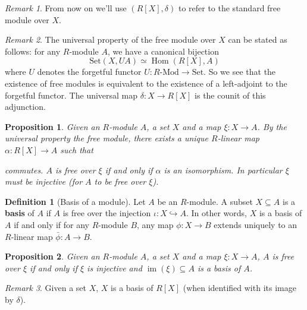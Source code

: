 \documentclass[a4paper,12pt,parskip=half*,chapterprefix=true,numbers=noendperiod]{scrreprt}
\newcommand{\opname}{\operatorname}
\newtheorem{proposition}{Proposition}[section]
\theoremstyle{definition}
\newtheorem{definition}{Definition}[section]
\theoremstyle{remark}
\newtheorem*{remark}{Remark}
\begin{document}
\begin{remark}
	From now on we'll use $(R[X],\delta)$ to refer to the standard free module over $X$.
\end{remark}
\begin{remark}
	The universal property of the free module over $X$ can be stated as follows: for any $R$-module $A$, we have a canonical bijection
	\begin{equation*}
		\text{Set}(X,UA)\simeq\opname{Hom}(R[X],A)
	\end{equation*}
	where $U$ denotes the forgetful functor $U:R\text{-Mod}\to\text{Set}$. So we see that the existence of free modules is equivalent to the existence of a left-adjoint to the forgetful functor. The universal map $\delta:X\to R[X]$ is the counit of this adjunction.
\end{remark}

\begin{proposition}	
	Given an $R$-module $A$, a set $X$ and a map $\xi:X\to A$. By the universal property the free module, there exists a unique $R$-linear map $\alpha:R[X]\to A$ such that
	\begin{figure}[H]
	\centering
	\end{figure}
	commutes. $A$ is free over $\xi$ if and only if $\alpha$ is an isomorphism. In particular $\xi$ must be injective (for $A$ to be free over $\xi$).
\end{proposition}

\begin{definition}[Basis of a module]
	Let $A$ be an $R$-module. A subset $X\subseteq A$ is a \textbf{basis} of $A$ if $A$ is free over the injection $\iota:X\hookrightarrow A$. In other words, $X$ is a basis of $A$ if and only if for any $R$-module $B$, any map $\phi:X\to B$ extends uniquely to an $R$-linear map $\bar{\phi}:A\to B$. 
\end{definition}

\begin{proposition}
	Given an $R$-module $A$, a set $X$ and a map $\xi:X\to A$, $A$ is free over $\xi$ if and only if $\xi$ is injective and $\opname{im}(\xi)\subseteq A$ is a basis of $A$.
\end{proposition}
\begin{remark}
	Given a set $X$, $X$ is a basis of $R[X]$ (when identified with its image by $\delta$).
\end{remark}
\end{document}
